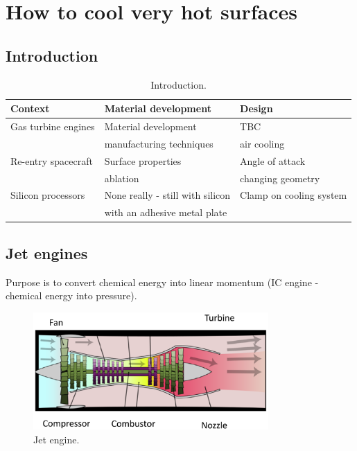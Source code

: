 \chapter{How to cool very hot surfaces}
\section{Introduction}
\begin{table}[H]
    \centering
    \begin{tabular}{@{}lll@{}}
        \toprule
        \textbf{Context} & \textbf{Material development} & \textbf{Design}\\
        \midrule
        Gas turbine engines & Material development & TBC\\
        & manufacturing techniques & air cooling\\
        Re-entry spacecraft & Surface properties & Angle of attack\\
        & ablation & changing geometry\\
        Silicon processors & None really - still with silicon & Clamp on cooling system\\
        & with an adhesive metal plate\\
        \bottomrule
    \end{tabular}
    \caption{Introduction.}
\end{table}
\section{Jet engines}
Purpose is to convert chemical energy into linear momentum (IC engine - chemical energy into pressure).
\begin{figure}[H]
    \centering
    \includegraphics[width = 0.8\textwidth]{img/figure19.png}
    \caption{Jet engine.}
\end{figure}
